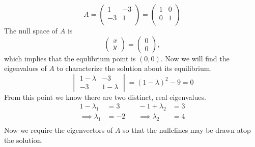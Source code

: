 \documentclass[12pt]{article}
\begin{document}
\begin{equation*}
  A = \begin{pmatrix}1&-3\\-3&1\\\end{pmatrix}
  = \begin{pmatrix}1&0\\0&1\\\end{pmatrix}
\end{equation*}
The null space of $A$ is
$$\begin{pmatrix}x\\y\end{pmatrix} = \begin{pmatrix}0\\0\end{pmatrix},$$ which
implies that the equlibrium point is $(0,0)$. Now we will find the eigenvalues of
$A$ to characterize the solution about its equilibrium.
\begin{equation*}
  \begin{vmatrix}1-\lambda&-3\\-3&1-\lambda\end{vmatrix} = {(1-\lambda)}^2 - 9 = 0
\end{equation*}
From this point we know there are two distinct, real eigenvalues.
\begin{equation*}
  \begin{aligned}
    1-\lambda_1&=3 &\quad -1+\lambda_2&=3 \\
    \implies\lambda_1 &=-2 &\quad \implies\lambda_2 &= 4 \\
  \end{aligned}
\end{equation*}
Now we require the eigenvectors of $A$ so that the nullclines may be drawn atop
the solution.
\end{document}

